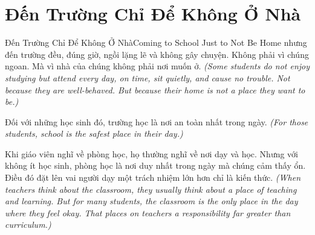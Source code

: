 \section{Đến Trường Chỉ Để Không Ở Nhà}
\begin{truyen}{Đến Trường Chỉ Để Không Ở Nhà}{Coming to School Just to Not Be Home}
 nhưng đến trường đều, đúng giờ, ngồi lặng lẽ và không gây chuyện. Không phải vì chúng ngoan. Mà vì nhà của chúng không phải nơi muốn ở.
\textit{(Some students do not enjoy studying but attend every day, on time, sit quietly, and cause no trouble. Not because they are well-behaved. But because their home is not a place they want to be.)}

Đối với những học sinh đó, trường học là nơi an toàn nhất trong ngày.
\textit{(For those students, school is the safest place in their day.)}

\begin{baihoc}
Khi giáo viên nghĩ về phòng học, họ thường nghĩ về nơi dạy và học. Nhưng với không ít học sinh, phòng học là nơi duy nhất trong ngày mà chúng cảm thấy ổn. Điều đó đặt lên vai người dạy một trách nhiệm lớn hơn chỉ là kiến thức.
\textit{(When teachers think about the classroom, they usually think about a place of teaching and learning. But for many students, the classroom is the only place in the day where they feel okay. That places on teachers a responsibility far greater than curriculum.)}
\end{baihoc}
\end{truyen}


